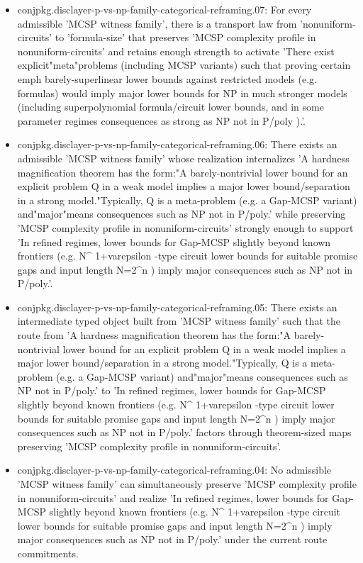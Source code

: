 \documentclass[11pt]{article}
\begin{document}
\begin{itemize}
\item conjpkg.disclayer-p-vs-np-family-categorical-reframing.07: For every admissible 'MCSP witness family', there is a transport law from 'nonuniform-circuits' to 'formula-size' that preserves 'MCSP complexity profile in nonuniform-circuits' and retains enough strength to activate 'There exist explicit"meta"problems (including MCSP variants) such that proving certain emph barely-superlinear lower bounds against restricted models (e.g. formulas) would imply major lower bounds for NP in much stronger models (including superpolynomial formula/circuit lower bounds, and in some parameter regimes consequences as strong as NP not in P/poly ).'.
\item conjpkg.disclayer-p-vs-np-family-categorical-reframing.06: There exists an admissible 'MCSP witness family' whose realization internalizes 'A hardness magnification theorem has the form:"A barely-nontrivial lower bound for an explicit problem Q in a weak model implies a major lower bound/separation in a strong model."Typically, Q is a meta-problem (e.g. a Gap-MCSP variant) and"major"means consequences such as NP not in P/poly.' while preserving 'MCSP complexity profile in nonuniform-circuits' strongly enough to support 'In refined regimes, lower bounds for Gap-MCSP slightly beyond known frontiers (e.g. N\textasciicircum{} 1+varepsilon -type circuit lower bounds for suitable promise gaps and input length N=2\textasciicircum{}n ) imply major consequences such as NP not in P/poly.'.
\item conjpkg.disclayer-p-vs-np-family-categorical-reframing.05: There exists an intermediate typed object built from 'MCSP witness family' such that the route from 'A hardness magnification theorem has the form:"A barely-nontrivial lower bound for an explicit problem Q in a weak model implies a major lower bound/separation in a strong model."Typically, Q is a meta-problem (e.g. a Gap-MCSP variant) and"major"means consequences such as NP not in P/poly.' to 'In refined regimes, lower bounds for Gap-MCSP slightly beyond known frontiers (e.g. N\textasciicircum{} 1+varepsilon -type circuit lower bounds for suitable promise gaps and input length N=2\textasciicircum{}n ) imply major consequences such as NP not in P/poly.' factors through theorem-sized maps preserving 'MCSP complexity profile in nonuniform-circuits'.
\item conjpkg.disclayer-p-vs-np-family-categorical-reframing.04: No admissible 'MCSP witness family' can simultaneously preserve 'MCSP complexity profile in nonuniform-circuits' and realize 'In refined regimes, lower bounds for Gap-MCSP slightly beyond known frontiers (e.g. N\textasciicircum{} 1+varepsilon -type circuit lower bounds for suitable promise gaps and input length N=2\textasciicircum{}n ) imply major consequences such as NP not in P/poly.' under the current route commitments.

\end{itemize}
\end{document}
